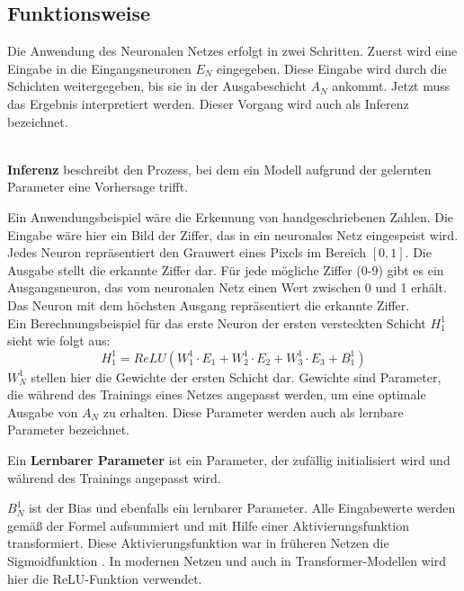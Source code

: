 \subsection{Funktionsweise}
Die Anwendung des Neuronalen Netzes erfolgt in zwei Schritten.
Zuerst wird eine Eingabe in die Eingangsneuronen $E_N$ eingegeben.
Diese Eingabe wird durch die Schichten weitergegeben, bis sie in der Ausgabeschicht $A_N$ ankommt.
Jetzt muss das Ergebnis interpretiert werden. Dieser Vorgang wird auch als Inferenz bezeichnet.\\\
\begin{definition}\label{def:inferenz}
    \textbf{Inferenz} beschreibt den Prozess, bei dem ein Modell aufgrund der gelernten Parameter eine Vorhersage trifft.
\end{definition}

Ein Anwendungsbeispiel wäre die Erkennung von handgeschriebenen Zahlen.
Die Eingabe wäre hier ein Bild der Ziffer, das in ein neuronales Netz eingespeist wird.
Jedes Neuron repräsentiert den Grauwert eines Pixels im Bereich $[0,1]$.
Die Ausgabe stellt die erkannte Ziffer dar.
Für jede mögliche Ziffer (0-9) gibt es ein Ausgangsneuron, das vom neuronalen Netz einen Wert zwischen 0 und 1 erhält.
Das Neuron mit dem höchsten Ausgang repräsentiert die erkannte Ziffer.\\

Ein Berechnungsbeispiel für das erste Neuron der ersten versteckten Schicht $H^1_1$ sieht wie folgt aus:
\begin{equation}
    H^1_1=ReLU(W^1_1\cdot E_1 + W^1_2\cdot E_2 + W^1_3\cdot E_3 + B^1_1)
\end{equation}
$W^1_N$ stellen hier die Gewichte der ersten Schicht dar.
Gewichte sind Parameter, die während des Trainings eines Netzes angepasst werden, um eine optimale Ausgabe von $A_N$ zu erhalten.
Diese Parameter werden auch als lernbare Parameter bezeichnet.\\

\begin{definition}\label{def:lernbare-parameter}
    Ein \textbf{Lernbarer Parameter} ist ein Parameter, der zufällig initialisiert wird und während des Trainings angepasst wird.
\end{definition}

$B^1_N$ ist der Bias und ebenfalls ein lernbarer Parameter.
Alle Eingabewerte werden gemäß der Formel aufsummiert und mit Hilfe einer Aktivierungsfunktion transformiert.
Diese Aktivierungsfunktion war in früheren Netzen die Sigmoidfunktion \pcref{img:sigmoid}.
In modernen Netzen und auch in Transformer-Modellen wird hier die ReLU-Funktion  verwendet.

